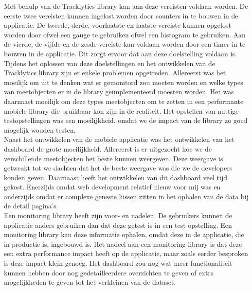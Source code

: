 Met behulp van de Tracklytics library kan aan deze vereisten voldaan worden. De eerste twee vereisten kunnen ingelost worden door counters in te bouwen in de applicatie. De tweede, derde, voorlaatste en laatste vereiste kunnen opgelost worden door ofwel een gauge te gebruiken ofwel een histogram te gebruiken. Aan de vierde, de vijfde en de zesde vereiste kan voldaan worden door een timer in te bouwen in de applicatie. Dit zorgt ervoor dat aan deze doelstelling voldaan is.\\

Tijdens het oplossen van deze doelstellingen en het ontwikkelen van de Tracklytics library zijn er enkele problemen opgetreden. Allereerst was het moeilijk om uit te denken wat er gemonitord zou moeten worden en welke types van meetobjecten er in de library ge\"implementeerd moesten worden. Het was daarnaast moeilijk om deze types meetobjecten om te zetten in een performante mobiele library die bruikbaar kon zijn in de realiteit. Het opstellen van nuttige testopstellingen was een moeilijkheid, omdat we de impact van de library zo goed mogelijk wouden testen.\\

Naast het ontwikkelen van de mobiele applicatie was het ontwikkelen van het dashboard de grote moeilijkheid. Allereerst is er uitgezocht hoe we de verschillende meetobjecten het beste kunnen weergeven. Deze weergave is getweakt tot we dachten dat het de beste weergave was die we de developers konden geven. Daarnaast heeft het ontwikkelen van dit dashboard veel tijd gekost. Enerzijds omdat web development relatief nieuw voor mij was en anderzijds omdat er complexe geneste lussen zitten in het ophalen van de data bij de detail pagina's. \\

Een monitoring library heeft zijn voor- en nadelen. De gebruikers kunnen de applicatie anders gebruiken dan dat deze getest is in een test opstelling. Een monitoring library kan deze informatie ophalen, omdat deze in de applicatie, die in productie is, ingebouwd is. Het nadeel aan een monitoring library is dat deze een extra performance impact heeft op de applicatie, maar zoals eerder besproken is deze impact klein genoeg. Het dashboard zou nog wat meer functionaliteit kunnen hebben door nog gedetailleerdere overzichten te geven of extra mogelijkheden te geven tot het verkleinen van de dataset. \\

